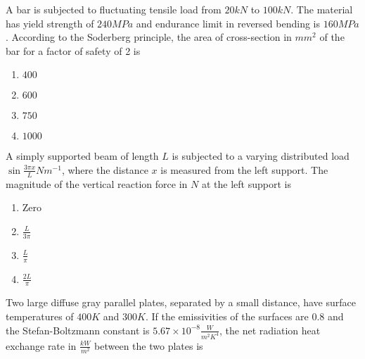 \iffalse
\author{EE24BTECH11049}
\section{me}
\chapter{2013}
\fi

    \item 
    A bar is subjected to fluctuating tensile load from $20 kN$ to $100 kN$. The material has yield strength of $240 MPa$ and endurance limit in reversed bending is $160 MPa$. According to the Soderberg principle, the area of cross-section in $mm^2$ of the bar for a factor of safety of 2 is
    \hfill{}
    \begin{multicols}{4}
        \begin{enumerate}
            \item $400$
            \item $600$
            \item $750$
            \item $1000$
        \end{enumerate}
    \end{multicols}

    \item 
    A simply supported beam of length $L$ is subjected to a varying distributed load $\sin{\frac{3\pi x}{L}} Nm^{-1}$, where the distance $x$ is measured from the left support. The magnitude of the vertical reaction force in $N$ at the left support is
    \hfill{}

    \begin{multicols}{4}
        \begin{enumerate}
            \item Zero
            \item $\frac{L}{3\pi}$
            \item $\frac{L}{\pi}$
            \item $\frac{2L}{\pi}$
        \end{enumerate}
    \end{multicols}

    \item 
    Two large diffuse gray parallel plates, separated by a small distance, have surface temperatures of $400 K$ and $300 K$. If the emissivities of the surfaces are $0.8$ and the Stefan-Boltzmann constant is $5.67 \times 10^{-8}\frac{W}{m^2K^4}$, the net radiation heat exchange rate in $\frac{kW}{m^2}$ between the two plates is
    \hfill{}

